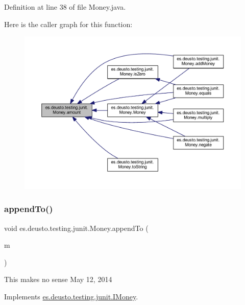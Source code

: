 Definition at line 38 of file Money.\+java.

Here is the caller graph for this function\+:\nopagebreak
\begin{figure}[H]
\begin{center}
\leavevmode
\includegraphics[width=350pt]{classes_1_1deusto_1_1testing_1_1junit_1_1_money_a9bef5d9027f270e8ce0303e4f929bbd5_icgraph}
\end{center}
\end{figure}
\mbox{\label{classes_1_1deusto_1_1testing_1_1junit_1_1_money_aa9a6df9f35118060914ae6e8f74d1d51}} 
\subsubsection{\texorpdfstring{append\+To()}{appendTo()}}
{\footnotesize\ttfamily void es.\+deusto.\+testing.\+junit.\+Money.\+append\+To (\begin{DoxyParamCaption}\item[{\mbox{\hyperlink{classes_1_1deusto_1_1testing_1_1junit_1_1_money_bag}{Money\+Bag}}}]{m }\end{DoxyParamCaption})}

This makes no sense May 12, 2014 

Implements \mbox{\hyperlink{interfacees_1_1deusto_1_1testing_1_1junit_1_1_i_money_ae45bc758e69a0017f083f11d050c53cb}{es.\+deusto.\+testing.\+junit.\+I\+Money}}.



